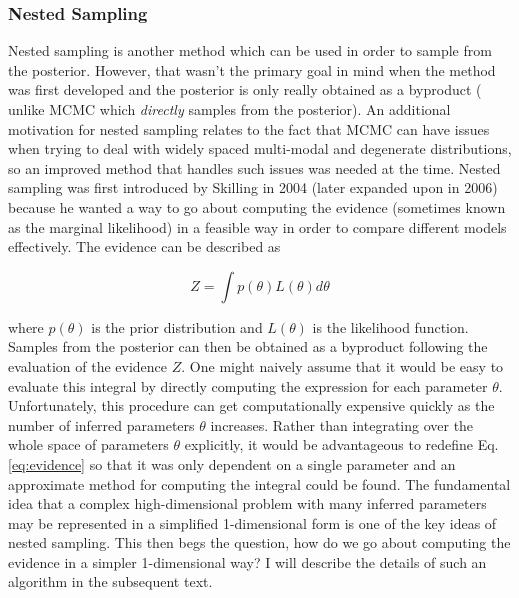 %
%

%
\subsubsection{Nested Sampling}

Nested sampling is another method which can be used in order to sample from the posterior. However, that wasn't the primary goal in mind when the method was first developed and the posterior is only really obtained as a byproduct (
unlike \ac{MCMC} which \textit{directly} samples from the posterior). An additional motivation for nested sampling relates to the fact that \ac{MCMC} can have issues when trying to deal with widely spaced multi-modal and degenerate distributions, so an improved method that handles such issues was needed at the time. Nested sampling was first introduced by Skilling in 2004 (later expanded upon in 2006) because he wanted a way to go about computing the evidence (sometimes known as the marginal likelihood) in a feasible way in order to compare different models effectively. The evidence can be described as

\begin{equation}
    Z = \int p(\theta) L(\theta) d\theta \label{eq:evidence}
\end{equation}

where $p(\theta)$ is the prior distribution and $L(\theta)$ is the likelihood function. Samples from the posterior can then be obtained as a byproduct following the evaluation of the evidence $Z$. One might naively assume that it would be easy to evaluate this integral by directly computing the expression for each parameter $\theta$. Unfortunately, this procedure can get computationally expensive quickly as the number of inferred parameters $\theta$ increases. Rather than integrating over the whole space of parameters $\theta$ explicitly, it would be advantageous to redefine Eq. \ref{eq:evidence} so that it was only dependent on a single parameter and an approximate method for computing the integral could be found. The fundamental idea that a complex high-dimensional problem with many inferred parameters may be represented in a simplified 1-dimensional form is one of the key ideas of nested sampling. This then begs the question, how do we go about computing the evidence in a simpler 1-dimensional way? I will describe 
the details of such an algorithm in the subsequent text.

